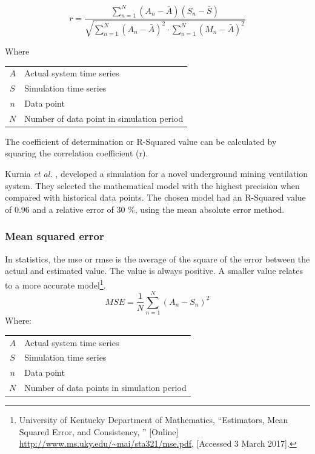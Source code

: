  		\begin{equation}
 		\label{eq: Correlation coefficient}
 		r = \dfrac{\sum_{n=1}^{N}(A_n - \bar{A})(S_n - \bar{S})}{\sqrt{\sum_{n=1}^{N}(A_n - \bar{A})^2 \cdot \sum_{n=1}^{N}(M_n - \bar{A})^2}}
 		\end{equation}
 		\par
 		Where \par
 		\begin{table}[!htbp]
 			\centering
 			\begin{tabular}{cl}
 				$A$ & Actual system time series \\
 				$S$ & Simulation time series \\
 				$n$ & Data point \\
 				$N$ & Number of data point in simulation period \\
 			\end{tabular} 
 		\end{table}	
 		The coefficient of determination or R-Squared value can be calculated by squaring the correlation coefficient (r). 
 		\par 
 			Kurnia \textit{et al.} \cite{kurnia2014simulation}, \cite{kurnia2014dust} developed a simulation for a novel underground mining ventilation system. They selected the mathematical model with the highest precision when compared with historical data points. The chosen model had an R-Squared value of 0.96 and a relative error of 30 \%, using the mean absolute error method. 
 			
 		\subsubsection{Mean squared error}	
 		In statistics, the \gls{mse} or \gls{rmse} is the average of the square of the error between the actual and estimated value. The value is always positive. A smaller value relates to a more accurate model\footnote{University of Kentucky Department of Mathematics, \enquote{Estimators, Mean Squared Error, and
 			Consistency, } [Online] \url{http://www.ms.uky.edu/~mai/sta321/mse.pdf}, [Accessed 3 March 2017].}.
 			\begin{equation}
 				\label{eq: rmse}
 				MSE = \dfrac{1}{N}\sum_{n=1}^{N}{(A_{n} - S_{n})^2}
 			\end{equation}
 			Where: \par
 			\begin{table}[!htbp]
 				\centering
 				\begin{tabular}{cl}
 					$A$ & Actual system time series \\
 					$S$ & Simulation time series \\
 					$n$ & Data point \\
 					$N$ & Number of data points in simulation period \\
 			\end{tabular} 
 			\end{table}			
